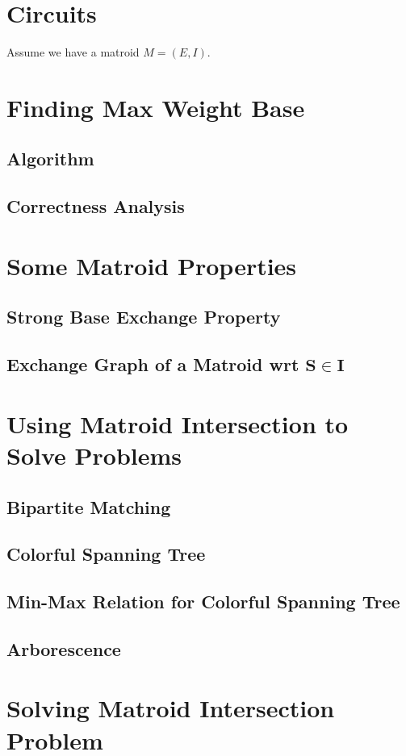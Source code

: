 \documentclass{article}
\begin{document}
\section{Circuits}
Assume we have a matroid $M=(E,I)$. 


\section{Finding Max Weight Base}
\subsection{Algorithm}
\subsection{Correctness Analysis}
\section{Some Matroid Properties}
\subsection{Strong Base Exchange Property}
\subsection{Exchange Graph of a Matroid wrt $\boldsymbol{S\in I}$}

\section{Using Matroid Intersection to Solve Problems}
\subsection{Bipartite Matching}
\subsection{Colorful Spanning Tree}
\subsection{Min-Max Relation for Colorful Spanning Tree}
\subsection{Arborescence}
\section{Solving Matroid Intersection Problem}





\pagebreak
%
%
\end{document}
